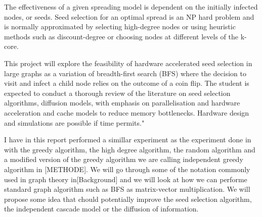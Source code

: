 The effectiveness of a given spreading model is dependent on the initially infected nodes, or seeds. Seed selection for an optimal spread is an NP hard problem and is normally approximated by selecting high-degree nodes or using heuristic methods such as discount-degree or choosing nodes at different levels of the k-core.

This project will explore the feasibility of hardware accelerated seed selection in large graphs as a variation of breadth-first search (BFS) where the decision to visit and infect a child node relies on the outcome of a coin flip. The student is expected to conduct a thorough review of the literature on seed selection algorithms, diffusion models, with emphasis on parallelisation and hardware acceleration and cache models to reduce memory bottlenecks. Hardware design and simulations are possible if time permits."
 

I have in this report performed a simillar experiment as the experiment done in \cite{Maximizespread2003} with the greedy algorithm, the high degree algorithm, the random algorithm and a modified version of the greedy algorithm we are calling independent greedy algorithm in [METHODE]. We will go through some of the notation commonly used in graph theory in[Background] and we will look at how we can performe standard graph algorithm such as BFS as matrix-vector multiplication. We will propose some idea that chould potentially improve the seed selection algorithm, the independent cascade model or the diffusion of information. 
